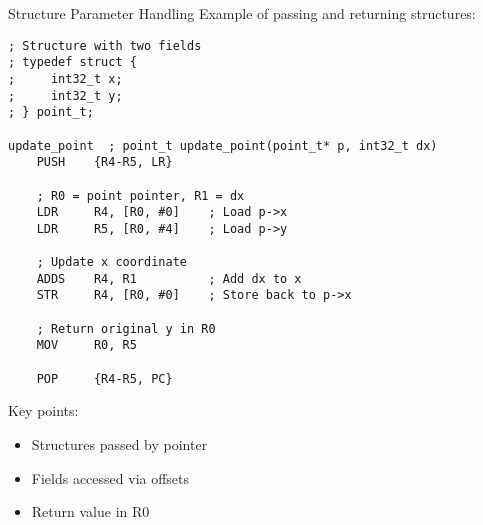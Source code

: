 \begin{example2}{Structure Parameter Handling}
Example of passing and returning structures:
\begin{lstlisting}[language=armasm, style=basesmol]
; Structure with two fields
; typedef struct {
;     int32_t x;
;     int32_t y;
; } point_t;

update_point  ; point_t update_point(point_t* p, int32_t dx)
    PUSH    {R4-R5, LR}
    
    ; R0 = point pointer, R1 = dx
    LDR     R4, [R0, #0]    ; Load p->x
    LDR     R5, [R0, #4]    ; Load p->y
    
    ; Update x coordinate
    ADDS    R4, R1          ; Add dx to x
    STR     R4, [R0, #0]    ; Store back to p->x
    
    ; Return original y in R0
    MOV     R0, R5          
    
    POP     {R4-R5, PC}     
\end{lstlisting}

Key points:
\begin{itemize}
  \item Structures passed by pointer
  \item Fields accessed via offsets
  \item Return value in R0
\end{itemize}
\end{example2}

